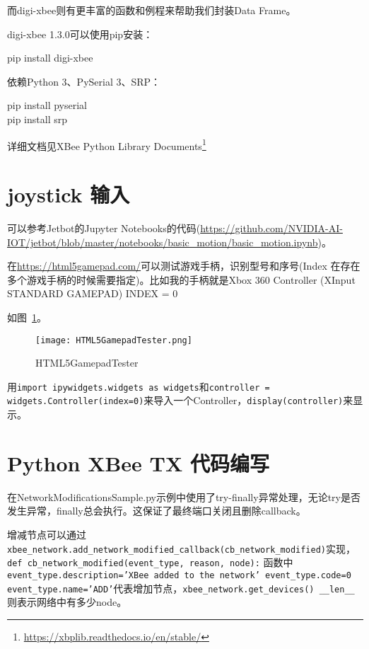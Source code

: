 而digi-xbee则有更丰富的函数和例程来帮助我们封装Data Frame。

digi-xbee 1.3.0可以使用pip安装：

\begin{tcolorbox}
    pip install digi-xbee
\end{tcolorbox}

依赖Python 3、PySerial 3、SRP：

\begin{tcolorbox}
    pip install pyserial \\
    pip install srp
\end{tcolorbox}

详细文档见XBee Python Library Documents\footnote{\url{https://xbplib.readthedocs.io/en/stable/}}

\section{joystick 输入}

可以参考Jetbot的Jupyter Notebooks的代码(\url{https://github.com/NVIDIA-AI-IOT/jetbot/blob/master/notebooks/basic_motion/basic_motion.ipynb})。

在\url{https://html5gamepad.com/}可以测试游戏手柄，识别型号和序号(Index 在存在多个游戏手柄的时候需要指定)。比如我的手柄就是Xbox 360 Controller (XInput STANDARD GAMEPAD) INDEX = 0

如图~\ref{fig:HTML5GamepadTester}。

\begin{figure}[htbp]
    \centering
    \texttt{[image: HTML5GamepadTester.png]}
    \caption{HTML5GamepadTester}
    \label{fig:HTML5GamepadTester}
\end{figure}

用\texttt{import ipywidgets.widgets as widgets}和\texttt{controller = widgets.Controller(index=0)}来导入一个Controller，\texttt{display(controller)}来显示。

\section{Python XBee TX 代码编写}

在NetworkModificationsSample.py示例中使用了try-finally异常处理，无论try是否发生异常，finally总会执行。这保证了最终端口关闭且删除callback。


增减节点可以通过\texttt{xbee_network.add_network_modified_callback(cb_network_modified)}实现，\texttt{def cb_network_modified(event_type, reason, node):} 函数中\texttt{event_type.description='XBee added to the network' event_type.code=0 event_type.name='ADD'}代表增加节点，\texttt{xbee_network.get_devices() __len__}则表示网络中有多少node。

